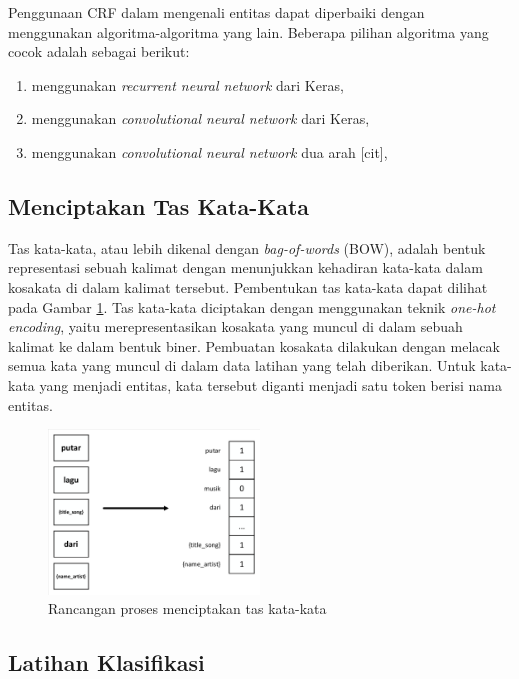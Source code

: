Penggunaan CRF dalam mengenali entitas dapat diperbaiki dengan menggunakan algoritma-algoritma yang lain. Beberapa pilihan algoritma yang cocok adalah sebagai berikut:

\begin{enumerate}
	\item menggunakan \textit{recurrent neural network} dari Keras,
	\item menggunakan \textit{convolutional neural network} dari Keras,
	\item menggunakan \textit{convolutional neural network} dua arah [cit],
\end{enumerate}

\subsection{Menciptakan Tas Kata-Kata}

Tas kata-kata, atau lebih dikenal dengan \textit{bag-of-words} (BOW), adalah bentuk representasi sebuah kalimat dengan menunjukkan kehadiran kata-kata dalam kosakata di dalam kalimat tersebut. Pembentukan tas kata-kata dapat dilihat pada Gambar \ref{fig:design_bow}. Tas kata-kata diciptakan dengan menggunakan teknik \textit{one-hot encoding}, yaitu merepresentasikan kosakata yang muncul di dalam sebuah kalimat ke dalam bentuk biner. Pembuatan kosakata dilakukan dengan melacak semua kata yang muncul di dalam data latihan yang telah diberikan. Untuk kata-kata yang menjadi entitas, kata tersebut diganti menjadi satu token berisi nama entitas.

\begin{figure}[H]
	\centering
	\includegraphics[width=0.5\textwidth, trim=3 3 3 3, clip]{resources/4-design_bow.pdf}
	\caption{Rancangan proses menciptakan tas kata-kata}
	\label{fig:design_bow}
\end{figure}

\subsection{Latihan Klasifikasi}

